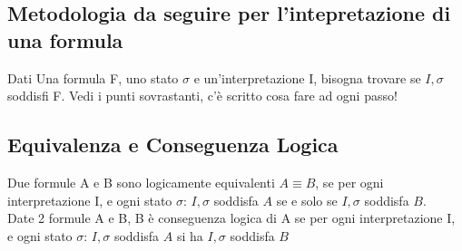 \documentclass[11pt]{article}
\begin{document}
\subsection{Metodologia da seguire per l'intepretazione di una formula}
Dati Una formula F, uno stato $\sigma$ e un'interpretazione I, bisogna trovare se $I, \sigma$ soddisfi F. Vedi i punti sovrastanti, 
c'è scritto cosa fare ad ogni passo!
\subsection{Equivalenza e Conseguenza Logica}
Due formule A e B sono logicamente equivalenti $A \equiv B$, se per ogni interpretazione I, 
e ogni stato $\sigma$: $I, \sigma$ soddisfa $A$ se e solo se $I, \sigma$ soddisfa $B$.\\
Date 2 formule A e B, B è conseguenza logica di A se per ogni interpretazione I, 
e ogni stato $\sigma$: $I, \sigma$ soddisfa $A$ si ha $I, \sigma$ soddisfa $B$
\end{document}
